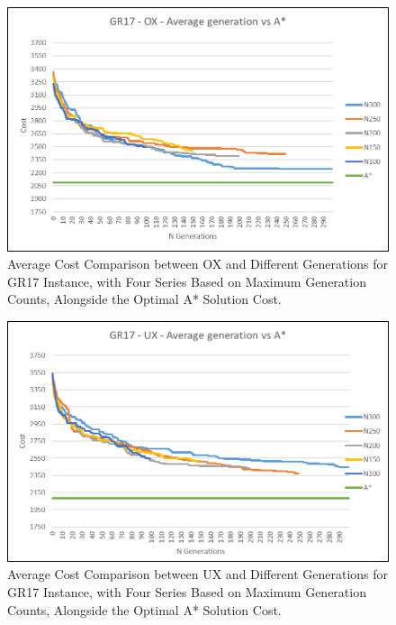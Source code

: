 \documentclass[runningheads]{llncs}
\begin{document}
\begin{figure}[H]
  \centering
  \begin{minipage}{0.7\textwidth}
    \centering
    \includegraphics[width=\linewidth]{OX.png}
    \caption{Average Cost Comparison between OX and Different Generations for GR17 Instance, with Four Series Based on Maximum Generation Counts, Alongside the Optimal A* Solution Cost.}
    \label{fig:ox-comparison}
  \end{minipage}
  \hfill
\end{figure}
\begin{figure}[H]
\centering
  \begin{minipage}{0.7\textwidth}
    \centering
    \includegraphics[width=\linewidth]{UX.png}
    \caption{Average Cost Comparison between UX and Different Generations for GR17 Instance, with Four Series Based on Maximum Generation Counts, Alongside the Optimal A* Solution Cost.}
    \label{fig:ux-comparison}
  \end{minipage}
  \hfill
\end{figure}
\end{document}
